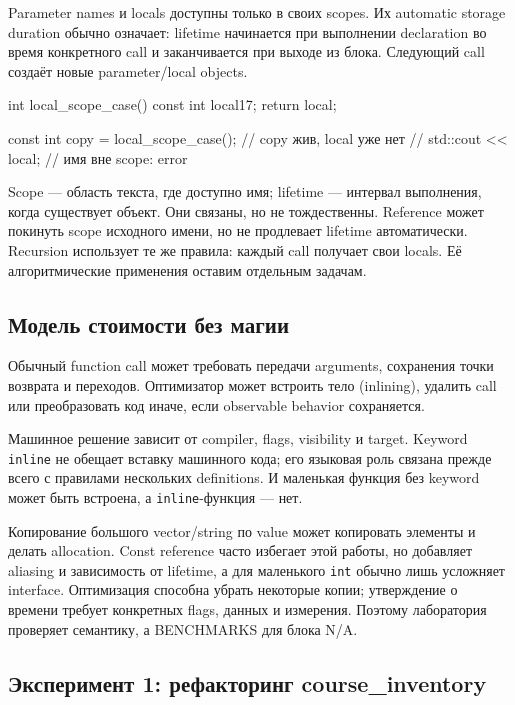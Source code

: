 Parameter names и locals доступны только в своих scopes. Их automatic
storage duration обычно означает: lifetime начинается при выполнении
declaration во время конкретного call и заканчивается при выходе из блока.
Следующий call создаёт новые parameter/local objects.

\begin{cppcode}
int local_scope_case() {
    const int local{17};
    return local;
}

const int copy = local_scope_case(); // copy жив, local уже нет
// std::cout << local;                // имя вне scope: error
\end{cppcode}

Scope --- область текста, где доступно имя; lifetime --- интервал выполнения,
когда существует объект. Они связаны, но не тождественны. Reference может
покинуть scope исходного имени, но не продлевает lifetime автоматически.
Recursion использует те же правила: каждый call получает свои locals. Её
алгоритмические применения оставим отдельным задачам.

\subsection{Модель стоимости без магии}

Обычный function call может требовать передачи arguments, сохранения точки
возврата и переходов. Оптимизатор может встроить тело (inlining), удалить call
или преобразовать код иначе, если observable behavior сохраняется.

\begin{implementationbox}[Inlining]
Машинное решение зависит от compiler, flags, visibility и target. Keyword
\texttt{inline} не обещает вставку машинного кода; его языковая роль связана
прежде всего с правилами нескольких definitions. И маленькая функция без
keyword может быть встроена, а \texttt{inline}-функция --- нет.
\end{implementationbox}

Копирование большого vector/string по value может копировать элементы и
делать allocation. Const reference часто избегает этой работы, но добавляет
aliasing и зависимость от lifetime, а для маленького \texttt{int} обычно лишь
усложняет interface. Оптимизация способна убрать некоторые копии; утверждение
о времени требует конкретных flags, данных и измерения. Поэтому лаборатория
проверяет семантику, а BENCHMARKS для блока N/A.

\subsection{Эксперимент 1: рефакторинг course\_inventory}

